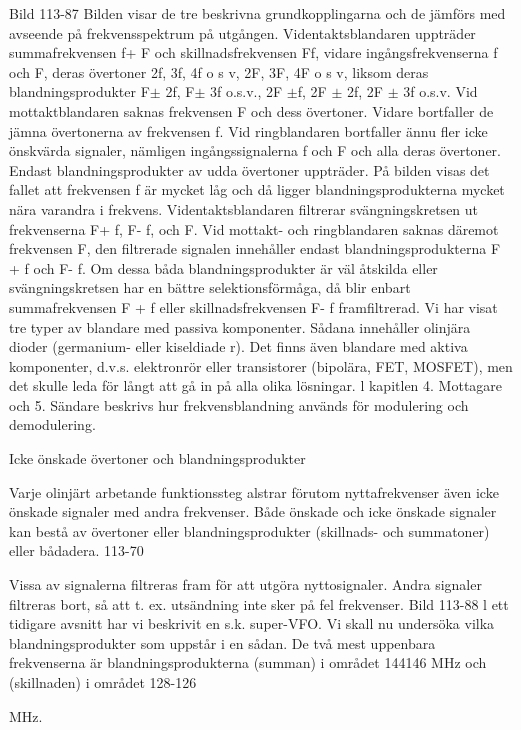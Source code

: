 Bild 113-87
Bilden visar de tre beskrivna grundkopplingarna och de jämförs med avseende på frekvensspektrum på utgången.
Videntaktsblandaren uppträder summafrekvensen f+ F och skillnadsfrekvensen Ff, vidare ingångsfrekvenserna f och F, deras
övertoner 2f, 3f, 4f o s v, 2F, 3F, 4F o s v,
liksom deras blandningsprodukter F\(\pm\) 2f, F\(\pm\)
3f o.s.v., 2F \(\pm\)f, 2F \(\pm\) 2f, 2F \(\pm\) 3f o.s.v.
Vid mottaktblandaren saknas frekvensen F och dess övertoner. Vidare bortfaller
de jämna övertonerna av frekvensen f.
Vid ringblandaren bortfaller ännu fler icke
önskvärda signaler, nämligen ingångssignalerna f och F och alla deras övertoner.
Endast blandningsprodukter av udda övertoner uppträder.
På bilden visas det fallet att frekvensen f
är mycket låg och då ligger blandningsprodukterna mycket nära varandra i frekvens.
Videntaktsblandaren filtrerar svängningskretsen ut frekvenserna F+ f, F- f, och F. Vid
mottakt- och ringblandaren saknas däremot
frekvensen F, den filtrerade signalen innehåller endast blandningsprodukterna F + f
och F- f. Om dessa båda blandningsprodukter är väl åtskilda eller svängningskretsen
har en bättre selektionsförmåga, då blir enbart summafrekvensen F + f eller skillnadsfrekvensen F- f framfiltrerad.
Vi har visat tre typer av blandare med
passiva komponenter. Sådana innehåller
olinjära dioder (germanium- eller kiseldiade r).
Det finns även blandare med aktiva komponenter, d.v.s. elektronrör eller transistorer
(bipolära, FET, MOSFET), men det skulle
leda för långt att gå in på alla olika lösningar.
l kapitlen 4. Mottagare och 5. Sändare beskrivs hur frekvensblandning används för
modulering och demodulering.

Icke önskade övertoner och blandningsprodukter

Varje olinjärt arbetande funktionssteg alstrar förutom nyttafrekvenser även icke önskade signaler med andra frekvenser. Både
önskade och icke önskade signaler kan bestå av övertoner eller blandningsprodukter
(skillnads- och summatoner) eller bådadera.
113-70

Vissa av signalerna filtreras fram för att
utgöra nyttosignaler. Andra signaler filtreras
bort, så att t. ex. utsändning inte sker på fel
frekvenser.
Bild 113-88
l ett tidigare avsnitt har vi beskrivit en s.k.
super-VFO. Vi skall nu undersöka vilka blandningsprodukter som uppstår i en sådan. De
två mest uppenbara frekvenserna är blandningsprodukterna (summan) i området 144146 MHz och (skillnaden) i området 128-126

MHz.

